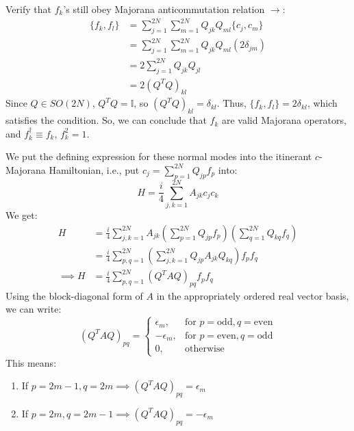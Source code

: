 \documentclass[11pt,a4paper]{article}
\begin{document}
Verify that $f_k$'s still obey Majorana anticommutation relation $\rightarrow$:
\begin{align*}
\{f_k, f_l\} &= \sum_{j=1}^{2N} \sum_{m=1}^{2N} Q_{jk} Q_{ml} \{c_j, c_m\} \\
&= \sum_{j=1}^{2N} \sum_{m=1}^{2N} Q_{jk} Q_{ml} (2\delta_{jm}) \\
&= 2 \sum_{j=1}^{2N} Q_{jk} Q_{jl} \\
&= 2 (Q^T Q)_{kl}
\end{align*}
Since $Q \in SO(2N)$, $Q^T Q = \mathbb{I}$, so $(Q^T Q)_{kl} = \delta_{kl}$. Thus, $\{f_k, f_l\} = 2\delta_{kl}$, which satisfies the condition.
So, we can conclude that $f_k$ are valid Majorana operators, and $f_k^\dagger \equiv f_k$, $f_k^2 = 1$.

We put the defining expression for these normal modes into the itinerant $c$-Majorana Hamiltonian, i.e., put $c_j = \sum_{p=1}^{2N} Q_{jp} f_p$ into:
\begin{equation*}
H = \frac{i}{4} \sum_{j,k=1}^{2N} A_{jk} c_j c_k
\end{equation*}
We get:
\begin{align*}
H &= \frac{i}{4} \sum_{j,k=1}^{2N} A_{jk} \left(\sum_{p=1}^{2N} Q_{jp} f_p\right) \left(\sum_{q=1}^{2N} Q_{kq} f_q\right) \\
&= \frac{i}{4} \sum_{p,q=1}^{2N} \left( \sum_{j,k=1}^{2N} Q_{jp} A_{jk} Q_{kq} \right) f_p f_q \\
\implies H &= \frac{i}{4} \sum_{p,q=1}^{2N} (Q^T A Q)_{pq} f_p f_q
\end{align*}
Using the block-diagonal form of $A$ in the appropriately ordered real vector basis, we can write:
\begin{equation*}
(Q^T A Q)_{pq} = 
\begin{cases} 
\epsilon_m, & \text{for } p = \text{odd}, q = \text{even} \\
-\epsilon_m, & \text{for } p = \text{even}, q = \text{odd} \\
0, & \text{otherwise}
\end{cases}
\end{equation*}
This means:
\begin{enumerate}
    \item If $p = 2m-1, q = 2m \implies (Q^T A Q)_{pq} = \epsilon_m$
    \item If $p = 2m, q = 2m-1 \implies (Q^T A Q)_{pq} = -\epsilon_m$
\end{enumerate}
\end{document}

